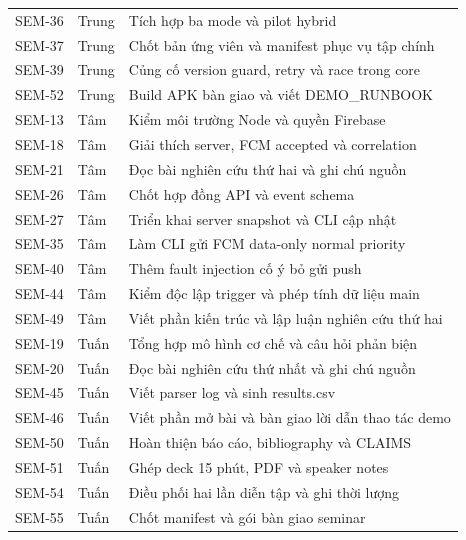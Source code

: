\begin{longtable}{@{}p{1.7cm}p{1.55cm}p{11.65cm}@{}}
SEM-36 & Trung & Tích hợp ba mode và pilot hybrid \\
SEM-37 & Trung & Chốt bản ứng viên và manifest phục vụ tập chính \\
SEM-39 & Trung & Củng cố version guard, retry và race trong core \\
SEM-52 & Trung & Build APK bàn giao và viết DEMO\_RUNBOOK \\
\pagebreak
SEM-13 & Tâm & Kiểm môi trường Node và quyền Firebase \\
SEM-18 & Tâm & Giải thích server, FCM accepted và correlation \\
SEM-21 & Tâm & Đọc bài nghiên cứu thứ hai và ghi chú nguồn \\
SEM-26 & Tâm & Chốt hợp đồng API và event schema \\
SEM-27 & Tâm & Triển khai server snapshot và CLI cập nhật \\
SEM-35 & Tâm & Làm CLI gửi FCM data-only normal priority \\
SEM-40 & Tâm & Thêm fault injection cố ý bỏ gửi push \\
SEM-44 & Tâm & Kiểm độc lập trigger và phép tính dữ liệu main \\
SEM-49 & Tâm & Viết phần kiến trúc và lập luận nghiên cứu thứ hai \\
SEM-19 & Tuấn & Tổng hợp mô hình cơ chế và câu hỏi phản biện \\
SEM-20 & Tuấn & Đọc bài nghiên cứu thứ nhất và ghi chú nguồn \\
SEM-45 & Tuấn & Viết parser log và sinh results.csv \\
SEM-46 & Tuấn & Viết phần mở bài và bàn giao lời dẫn thao tác demo \\
SEM-50 & Tuấn & Hoàn thiện báo cáo, bibliography và CLAIMS \\
SEM-51 & Tuấn & Ghép deck 15 phút, PDF và speaker notes \\
SEM-54 & Tuấn & Điều phối hai lần diễn tập và ghi thời lượng \\
SEM-55 & Tuấn & Chốt manifest và gói bàn giao seminar \\
\end{longtable}
\normalsize
